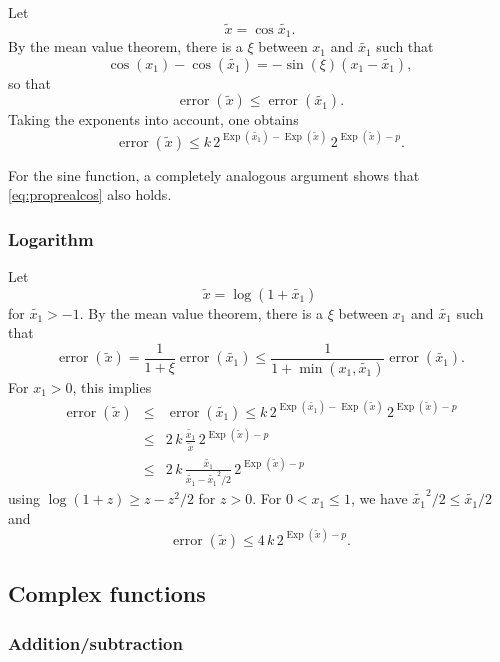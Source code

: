 \documentclass [12pt]{article}
\newcommand {\appro}[1]{\widetilde {#1}}
\DeclareMathOperator{\Exp}{\operatorname {Exp}}
\newcommand{\error}{\operatorname {error}}
\renewcommand {\leq}{\leqslant}
\renewcommand {\geq}{\geqslant}
\begin{document}
Let
\[
\appro x = \cos {\appro {x_1}}.
\]
By the mean value theorem, there is a $\xi$ between $x_1$ and $\appro {x_1}$
such that
\[
\cos (x_1) - \cos (\appro {x_1}) = -\sin (\xi) (x_1 - \appro {x_1}),
\]
so that
\[
\error (\appro x)
\leq \error (\appro {x_1}).
\]
Taking the exponents into account, one obtains
\begin {equation}
\label {eq:proprealcos}
\error (\appro x)
\leq
k \, 2^{\Exp (\appro {x_1}) - \Exp (\appro x)}
\, 2^{\Exp (\appro x) - p}.
\end {equation}

For the sine function, a completely analogous argument shows that
\eqref {eq:proprealcos} also holds.


\subsubsection {Logarithm}
\label {sssec:propreallog}

Let
\[
\appro x = \log (1 + \appro {x_1})
\]
for $\appro {x_1} > -1$.
By the mean value theorem, there is a $\xi$ between $x_1$ and $\appro {x_1}$
such that
\[
\error (\appro x) = \frac {1}{1 + \xi} \error (\appro {x_1})
\leq \frac {1}{1 + \min (x_1, \appro {x_1})} \error (\appro {x_1}).
\]
For $x_1 > 0$, this implies
\begin {eqnarray*}
\error (\appro x)
& \leq & \error (\appro {x_1})
\leq
k \, 2^{\Exp (\appro {x_1}) - \Exp (\appro x)}
\, 2^{\Exp (\appro x) - p} \\
& \leq & 2 \, k \, \frac {\appro {x_1}}{\appro x} \, 2^{\Exp (\appro x) - p} \\
& \leq & 2 \, k \, \frac {\appro {x_1}}{\appro {x_1} - \appro {x_1}^2/2}
\, 2^{\Exp (\appro x) - p}
\end {eqnarray*}
using $\log (1 + z) \geq z - z^2/2$ for $z > 0$.
For $0 < x_1 \leq 1$, we have $\appro {x_1}^2/2 \leq \appro {x_1}/2$ and
\[
\error (\appro x)
\leq 4 \, k \, 2^{\Exp (\appro x) - p}.
\]


\subsection {Complex functions}

\subsubsection {Addition/subtraction}
\end{document}
